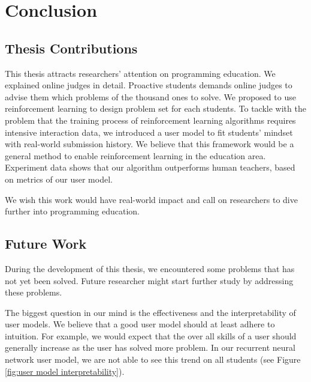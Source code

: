 
\chapter{Conclusion}

\section{Thesis Contributions}

    This thesis attracts researchers' attention on programming education.
    We explained online judges in detail.
    Proactive students demands online judges to advise them which problems of the thousand ones to solve.
    We proposed to use reinforcement learning to design problem set for each students.
    To tackle with the problem that the training process of reinforcement learning algorithms
    requires intensive interaction data,
    we introduced a user model to fit students' mindset with real-world submission history.
    We believe that this framework would be a general method to enable reinforcement learning in the education area.
    Experiment data shows that our algorithm outperforms human teachers,
    based on metrics of our user model.

    We wish this work would have real-world impact and call on researchers to dive further into programming education.

\section{Future Work}

    During the development of this thesis, we encountered some problems that has not yet been solved.
    Future researcher might start further study by addressing these problems.

    The biggest question in our mind is the effectiveness and the interpretability of user models.
    We believe that a good user model should at least adhere to intuition.
    For example, we would expect that the over all skills of a user should generally increase
    as the user has solved more problem.
    In our recurrent neural network user model, we are not able to see this trend on all students
    (see Figure \ref{fig:user model interpretability}).


